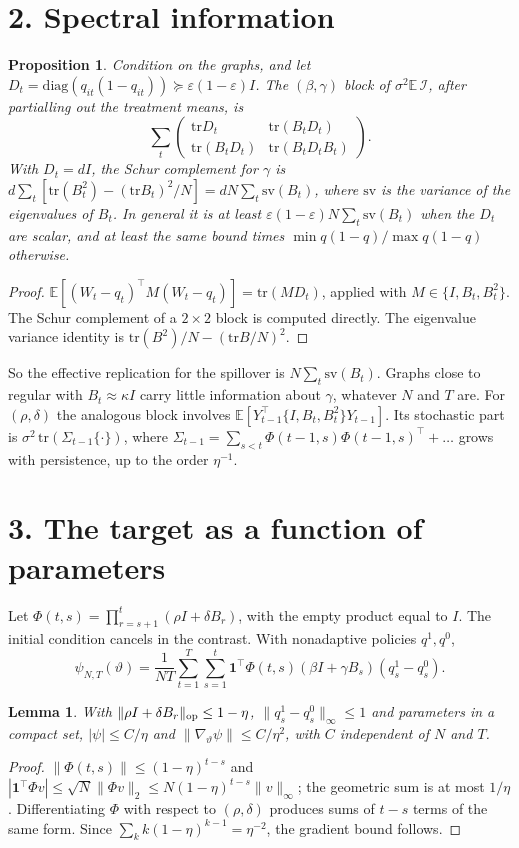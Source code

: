 \documentclass[11pt]{article}
\newtheorem{proposition}[theorem]{Proposition}
\newtheorem{lemma}[theorem]{Lemma}
\theoremstyle{definition}
\begin{document}
\section*{2. Spectral information}
\begin{proposition}\label{prop:info}
Condition on the graphs, and let $D_t=\mathrm{diag}(q_{it}(1-q_{it}))\succeq\varepsilon(1-\varepsilon)I$. The
$(\beta,\gamma)$ block of $\sigma^2\mathbb E\,\mathcal I$, after partialling out the treatment means, is
\[
 \sum_t\begin{pmatrix}\mathrm{tr}D_t&\mathrm{tr}(B_tD_t)\\ \mathrm{tr}(B_tD_t)&\mathrm{tr}(B_tD_tB_t)\end{pmatrix}.
\]
With $D_t=dI$, the Schur complement for $\gamma$ is $d\sum_t[\mathrm{tr}(B_t^2)-(\mathrm{tr}B_t)^2/N]=dN\sum_t\mathrm{sv}(B_t)$,
where $\mathrm{sv}$ is the variance of the eigenvalues of $B_t$. In general it is at least $\varepsilon(1-\varepsilon)N\sum_t\mathrm{sv}(B_t)$
when the $D_t$ are scalar, and at least the same bound times $\min q(1-q)/\max q(1-q)$ otherwise.
\end{proposition}
\begin{proof}
$\mathbb E[(W_t-q_t)^\top M(W_t-q_t)]=\mathrm{tr}(MD_t)$, applied with $M\in\{I,B_t,B_t^2\}$. The Schur complement of a
$2\times2$ block is computed directly. The eigenvalue variance identity is $\mathrm{tr}(B^2)/N-(\mathrm{tr}B/N)^2$.
\end{proof}
So the effective replication for the spillover is $N\sum_t\mathrm{sv}(B_t)$. Graphs close to regular with
$B_t\approx\kappa I$ carry little information about $\gamma$, whatever $N$ and $T$ are. For $(\rho,\delta)$ the analogous block
involves $\mathbb E[Y_{t-1}^\top\{I,B_t,B_t^2\}Y_{t-1}]$. Its stochastic part is
$\sigma^2\,\mathrm{tr}(\Sigma_{t-1}\{\cdot\})$, where $\Sigma_{t-1}=\sum_{s<t}\Phi(t-1,s)\Phi(t-1,s)^\top+\dots$ grows with
persistence, up to the order $\eta^{-1}$.

\section*{3. The target as a function of parameters}
Let $\Phi(t,s)=\prod_{r=s+1}^{t}(\rho I+\delta B_r)$, with the empty product equal to $I$. The initial condition cancels in the
contrast. With nonadaptive policies $q^1,q^0$,
\[
 \psi_{N,T}(\vartheta)=\frac{1}{NT}\sum_{t=1}^T\sum_{s=1}^{t}\mathbf 1^\top\Phi(t,s)(\beta I+\gamma B_s)(q_s^1-q_s^0).
\]
\begin{lemma}\label{lem:grad}
With $\|\rho I+\delta B_r\|_{\rm op}\le1-\eta$, $\|q^1_s-q^0_s\|_\infty\le1$ and parameters in a compact set,
$|\psi|\le C/\eta$ and $\|\nabla_\vartheta\psi\|\le C/\eta^2$, with $C$ independent of $N$ and $T$.
\end{lemma}
\begin{proof}
$\|\Phi(t,s)\|\le(1-\eta)^{t-s}$ and $|\mathbf 1^\top\Phi v|\le\sqrt N\|\Phi v\|_2\le N(1-\eta)^{t-s}\|v\|_\infty$; the geometric sum is at most $1/\eta$.
Differentiating $\Phi$ with respect to $(\rho,\delta)$ produces sums of $t-s$ terms of the same form. Since
$\sum_kk(1-\eta)^{k-1}=\eta^{-2}$, the gradient bound follows.
\end{proof}
\end{document}

